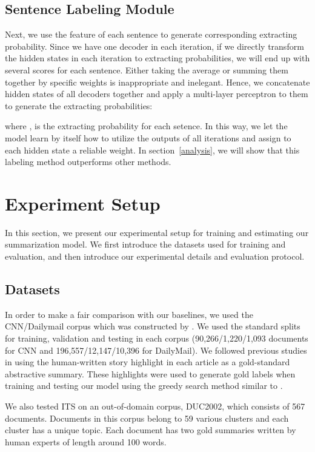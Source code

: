 \documentclass[11pt,a4paper]{article}
\begin{document}
\subsection{Sentence Labeling Module}
Next, we use the feature of each sentence to generate corresponding extracting probability. Since we have one decoder in each iteration, if we directly transform the hidden states in each iteration to extracting probabilities, we will end up with several scores for each sentence.
Either taking the average or summing them together by specific weights is inappropriate and inelegant.
Hence, we concatenate hidden states of all decoders together and apply a multi-layer perceptron to them to generate the extracting probabilities: 

where ,  is the extracting probability for each setence.
In this way, we let the model learn by itself how to utilize the outputs of all iterations and assign to each hidden state a reliable weight.
In section~\ref{analysis}, we will show that this labeling method outperforms other methods.

 
\section{Experiment Setup}
In this section, we present our experimental setup for training and estimating our summarization model.
We first introduce the datasets used for training and evaluation, and then introduce our experimental details and evaluation protocol.
\subsection{Datasets}
In order to make a fair comparison with our baselines, we used the CNN/Dailymail corpus which was constructed by \citet{Hermann2015Teaching}.
We used the standard splits for training, validation and testing in each corpus (90,266/1,220/1,093 documents for CNN and 196,557/12,147/10,396 for DailyMail).
We followed previous studies in using the human-written story highlight in each article as a gold-standard abstractive summary.
These highlights were used to generate gold labels when training and testing our model using the greedy search method similar to  \cite{Nallapati2016SummaRuNNer}.


We also tested ITS on an out-of-domain corpus, DUC2002, which consists of 567 documents.
Documents in this corpus belong to 59 various clusters and each cluster has a unique topic. 
Each document has two gold summaries written by human experts of length around 100 words.
\end{document}
